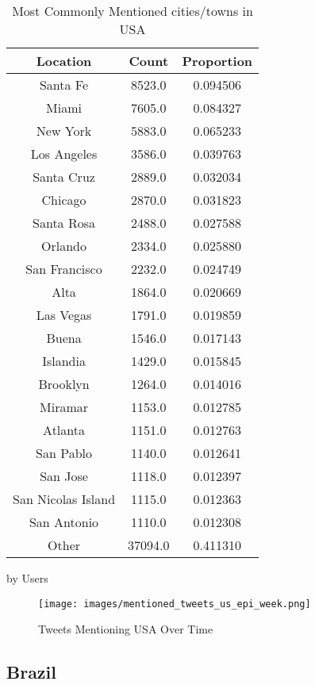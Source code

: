 \begin{table}
\begin{subtable}[c]{0.5\textwidth}
\centering
\begin{tabular}{|c|c|c|}
\hline
    \textbf{Location} & \textbf{Count} & \textbf{Proportion} \\
    \hline
    Santa Fe & 8523.0 & 0.094506 \\
    Miami & 7605.0 & 0.084327 \\
    New York & 5883.0 & 0.065233 \\
    Los Angeles & 3586.0 & 0.039763 \\
    Santa Cruz & 2889.0 & 0.032034 \\
    Chicago & 2870.0 & 0.031823 \\
    Santa Rosa & 2488.0 & 0.027588 \\
    Orlando & 2334.0 & 0.025880 \\
    San Francisco & 2232.0 & 0.024749 \\
    Alta & 1864.0 & 0.020669 \\
    Las Vegas & 1791.0 & 0.019859 \\
    Buena & 1546.0 & 0.017143 \\
    Islandia & 1429.0 & 0.015845 \\
    Brooklyn & 1264.0 & 0.014016 \\
    Miramar & 1153.0 & 0.012785 \\
    Atlanta & 1151.0 & 0.012763 \\
    San Pablo & 1140.0 & 0.012641 \\
    San Jose & 1118.0 & 0.012397 \\
    San Nicolas Island & 1115.0 & 0.012363 \\
    San Antonio & 1110.0 & 0.012308 \\
    Other & 37094.0 & 0.411310 \\
    \hline
    \end{tabular}
\caption{by Users}
\end{subtable}
\caption{Most Commonly Mentioned cities/towns in USA}
\label{table:mentioned-usa}
\end{table}

\begin{figure}[H]
    \centering
    \texttt{[image: images/mentioned\_tweets\_us\_epi\_week.png]}
    
    \caption{Tweets Mentioning USA Over Time}
    \label{fig:mentioned-tweets-us-epi-week}
\end{figure}

\subsection{Brazil}

